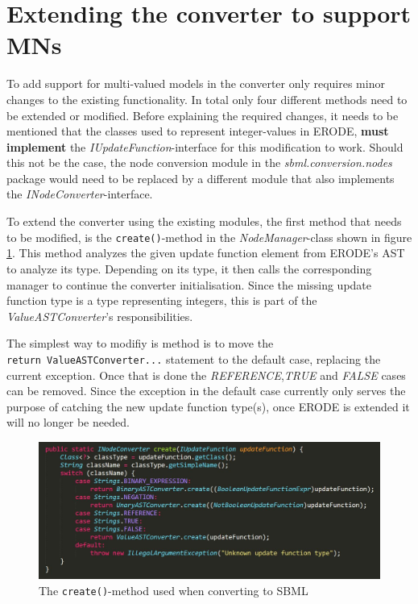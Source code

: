 \section{Extending the converter to support MNs}
To add support for multi-valued models in the converter only requires minor changes to the existing functionality. In total only four different methods need to be extended or modified.
Before explaining the required changes, it needs to be mentioned that the classes used to represent integer-values in ERODE, \textbf{must implement} the \emph{IUpdateFunction}-interface for this modification to work. Should this not be the case, the node conversion module in the \emph{sbml.conversion.nodes} package would need to be replaced by a different module that also implements the \emph{INodeConverter}-interface.

To extend the converter using the existing modules, the first method that needs to be modified, is the \texttt{create()}-method in the \emph{NodeManager}-class shown in figure \ref{fig:MNCreate}. This method analyzes the given update function element from ERODE's AST to analyze its type. Depending on its type, it then calls the corresponding manager to continue the converter initialisation. Since the missing update function type is a type representing integers, this is part of the \emph{ValueASTConverter}'s responsibilities.

The simplest way to modifiy is method is to move the \\
\texttt{return ValueASTConverter...} statement to the default case, replacing the current exception. Once that is done the \emph{REFERENCE},\emph{TRUE} and \emph{FALSE} cases can be removed. Since the exception in the default case currently only serves the purpose of catching the new update function type(s), once ERODE is extended it will no longer be needed.

\begin{figure}[H]
    \centering
    \includegraphics[scale=0.5]{Sections/Images/MNCreate.JPG}
    \caption{The \texttt{create()}-method used when converting to SBML}
    \label{fig:MNCreate}
\end{figure}

